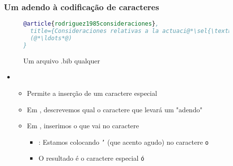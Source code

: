 \begin{frame}[fragile] \frametitle{Um adendo à codificação de caracteres}
\vspace{-0.5cm}
\begin{figure}[!t]
\caption{Um arquivo .bib qualquer}
\begin{lstlisting}[language=BibTeX]
@article{rodriguez1985consideraciones},
  title={Consideraciones relativas a la actuaci@*\sel{\textbackslash{}'\{o\}}*@n y l@*\sel{\textbackslash{}'\{i\}}*@mites de las oposiciones fonol@*\sel{\textbackslash{}'\{o\}}*@gicas interrupto/continuo y tenso/flojo en espa@*\sel{\textbackslash{}\textasciitilde{}\{n\}}*@ol},
  (@*\ldots*@)
}
\end{lstlisting}
\ownsrc
\end{figure}

\begin{itemize}
	\item {}
	\begin{itemize}
		\item Permite a inserção de um caractere especial
		\item Em , descrevemos qual o caractere que levará um "adendo"
		\item Em , inserimos o que vai no caractere
		\begin{itemize}
			\item {}: Estamos colocando \texttt{'} (que acento agudo) no caractere \texttt{o}
			\item O resultado é o caractere especial \texttt{ó}
		\end{itemize}
	\end{itemize}
\end{itemize}
\end{frame}

